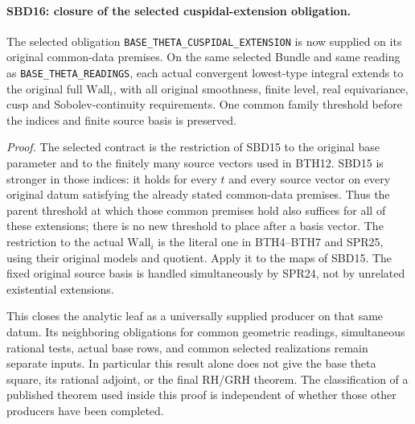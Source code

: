 \paragraph{SBD16: closure of the selected cuspidal-extension obligation.}
\label{claim:SBD16}
The selected obligation \texttt{BASE\_\allowbreak THETA\_\allowbreak CUSPIDAL\_\allowbreak EXTENSION}
is now supplied on its original common-data premises.  On
the same selected Bundle and same reading as
\texttt{BASE\_\allowbreak THETA\_\allowbreak READINGS}, each actual convergent
lowest-type integral extends to the original full
\(\mathrm{Wall}_i\), with all original smoothness, finite
level, real equivariance, cusp and Sobolev-continuity
requirements.  One common family threshold before the
indices and finite source basis is preserved.

\emph{Proof.}
The selected contract is the restriction of SBD15 to the
original base parameter and to the finitely many source
vectors used in BTH12.  SBD15 is stronger in those indices:
it holds for every \(t\) and every source vector on every
original datum satisfying the already stated common-data
premises.  Thus the parent threshold at which those common
premises hold also suffices for all of these extensions;
there is no new threshold to place after a basis vector.
The restriction to the actual \(\mathrm{Wall}_i\) is the
literal one in BTH4--BTH7 and SPR25, using their original
models and quotient.  Apply it to the maps of SBD15.  The
fixed original source basis is handled simultaneously by
SPR24, not by unrelated existential extensions.

This closes the analytic leaf as a universally supplied
producer on that same datum.  Its neighboring obligations
for common geometric readings, simultaneous rational
tests, actual base rows, and common selected realizations
remain separate inputs.  In particular this result alone
does not give the base theta square, its rational adjoint,
or the final RH/GRH theorem.  The classification of a
published theorem used inside this proof is independent
of whether those other producers have been completed.

